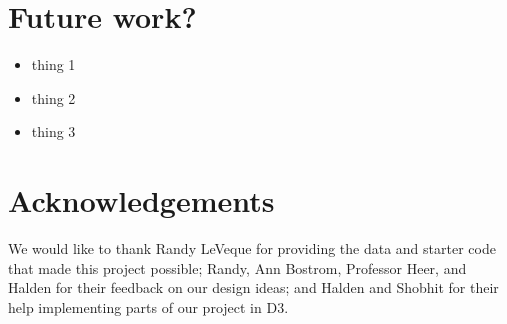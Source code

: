 \documentclass[a0,landscape]{a0poster}
\begin{document}
\begin{multicols}{3}





\section*{Future work?}
\begin{itemize}
	\item thing 1
	\item thing 2
	\item thing 3
\end{itemize}

\color{Gray}
\nocite{bader2017static,brenner2007mathematical}
 


\section*{Acknowledgements}
We would like to thank Randy LeVeque for providing the data and starter code that made this project possible; Randy, Ann Bostrom, Professor Heer, and Halden for their feedback on our design ideas; and Halden and Shobhit for their help implementing parts of our project in D3.



\end{multicols}
\end{document}
